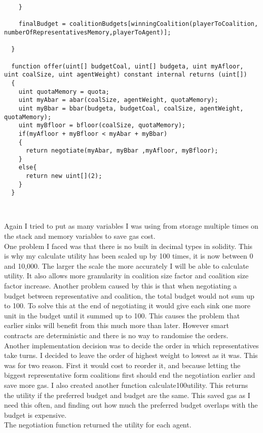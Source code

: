\begin{lstlisting}
    }

    finalBudget = coalitionBudgets[winningCoalition(playerToCoalition, numberOfRepresentativesMemory,playerToAgent)];

  }

  function offer(uint[] budgetCoal, uint[] budgeta, uint myAfloor, uint coalSize, uint agentWeight) constant internal returns (uint[])
  {
    uint quotaMemory = quota;
    uint myAbar = abar(coalSize, agentWeight, quotaMemory);
    uint myBbar = bbar(budgeta, budgetCoal, coalSize, agentWeight, quotaMemory);
    uint myBfloor = bfloor(coalSize, quotaMemory);
    if(myAfloor + myBfloor < myAbar + myBbar)
    {
      return negotiate(myAbar, myBbar ,myAfloor, myBfloor);
    }
    else{
      return new uint[](2);
    }
  }



\end{lstlisting}
Again I tried to put as many variables I was using from storage multiple times on the stack and memory variables to save gas cost. \\
One problem I faced was that there is no built in decimal types in solidity. This is why my calculate utility has been scaled up by 100 times, it is now between 0 and 10,000. The larger the scale the more accurately I will be able to calculate utility. It also allows more granularity in coalition size factor and coalition size factor increase. Another problem caused by this is that when negotiating a budget between representative and coalition, the total budget would not sum up to 100. To  solve this at the end of negotiating it would give each sink one more unit in the budget until it summed up to 100. This causes the problem that earlier sinks will benefit from this much more than later. However smart contracts are deterministic and there is no way to randomise the orders. \\
Another implementation decision was to decide the order in which representatives take turns. I decided to leave the order of highest weight to lowest as it was. This was for two reason. First it would cost to reorder it, and because letting the biggest representative form coalitions first should end the negotiation earlier and save more gas.
I also created another function calculate100utility. This returns the utility if the preferred budget and budget are the same. This saved gas as I need this often, and finding out how much the preferred budget overlaps with the budget is expensive. \\
The negotiation function returned the utility for each agent.
